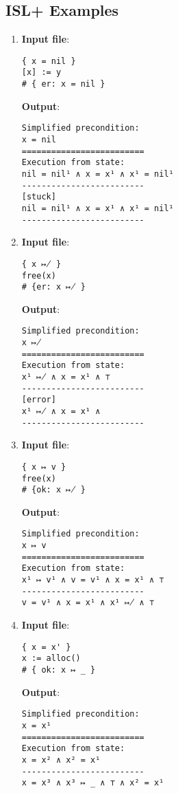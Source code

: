 \documentclass[parskip=half]{scrartcl}
\begin{document}
\subsection{ISL+ Examples}

\begin{enumerate}
\item 
\textbf{Input file}: 
\begin{verbatim}
{ x = nil }
[x] := y
# { er: x = nil }
\end{verbatim}

\textbf{Output}: 
\begin{verbatim}
Simplified precondition:
x = nil
=========================
Execution from state:
nil = nil¹ ∧ x = x¹ ∧ x¹ = nil¹
-------------------------
[stuck]
nil = nil¹ ∧ x = x¹ ∧ x¹ = nil¹
-------------------------
\end{verbatim}

\item 
\textbf{Input file}: 
\begin{verbatim}
{ x ↦̸ }
free(x)
# {er: x ↦̸ }
\end{verbatim}

\textbf{Output}: 
\begin{verbatim}
Simplified precondition:
x ↦̸
=========================
Execution from state:
x¹ ↦̸ ∧ x = x¹ ∧ ⊤
-------------------------
[error]
x¹ ↦̸ ∧ x = x¹ ∧ 
-------------------------
\end{verbatim}

\item 
\textbf{Input file}: 
\begin{verbatim}
{ x ↦ v }
free(x)
# {ok: x ↦̸ }
\end{verbatim}

\textbf{Output}: 
\begin{verbatim}
Simplified precondition:
x ↦ v
=========================
Execution from state:
x¹ ↦ v¹ ∧ v = v¹ ∧ x = x¹ ∧ ⊤
-------------------------
v = v¹ ∧ x = x¹ ∧ x¹ ↦̸ ∧ ⊤
\end{verbatim}

\item 
\textbf{Input file}: 
\begin{verbatim}
{ x = x' }
x := alloc()
# { ok: x ↦ _ }
\end{verbatim}

\textbf{Output}: 
\begin{verbatim}
Simplified precondition:
x = x¹
=========================
Execution from state:
x = x² ∧ x² = x¹
-------------------------
x = x³ ∧ x³ ↦ _ ∧ ⊤ ∧ x² = x¹
\end{verbatim}


\end{enumerate}
\end{document}
